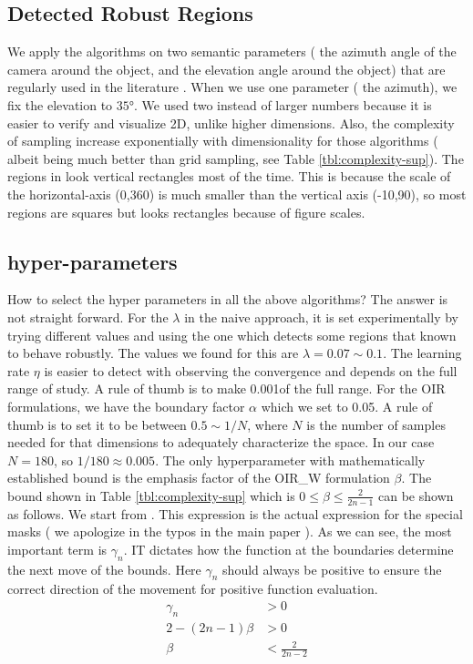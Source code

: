 \subsection{Detected Robust Regions}
We apply the algorithms on two semantic parameters ( the azimuth angle of the camera around the object, and the elevation angle around the object) that are regularly used in the literature \cite{sada,strike}. When we use one parameter ( the azimuth), we fix the elevation to $\ang{35}$. We used two instead of larger numbers because it is easier to verify and visualize 2D, unlike higher dimensions. Also, the complexity of sampling increase exponentially with dimensionality for those algorithms ( albeit being much better than grid sampling, see Table \ref{tbl:complexity-sup}). The regions in \figLabel{\ref{fig:ex1},\ref{fig:ex2}} look vertical rectangles most of the time. This is because the scale of the horizontal-axis (0,360) is much smaller than the vertical axis (-10,90), so most regions are squares but looks rectangles because of figure scales. 

\subsection{hyper-parameters}
How to select the hyper parameters in all the above algorithms? The answer is not straight forward. For the $\lambda$ in the naive approach, it is set experimentally by trying different values and using the one which detects some regions that known to behave robustly. The values we found for this are $\lambda = 0.07\sim0.1$. The learning rate $\eta$ is easier to detect with observing the convergence and depends on the full range of study. A rule of thumb is to make 0.001of the full range. For the OIR formulations, we have the boundary factor $\alpha$ which we set to 0.05. A rule of thumb is to set it to be between  $ 0.5 \sim 1/N$, where $N$ is the number of samples needed for that dimensions to adequately characterize the space. In our case $N=180$, so $1/180 \approx 0.005$. The only hyperparameter with mathematically established bound is the emphasis factor of the OIR\_W formulation $\beta$. The bound shown in Table \ref{tbl:complexity-sup} which is $0 \leq \beta \leq \frac{2}{2n-1}$ can be shown as follows. We start from \eqLabel{\ref{eq:n-mask-grad-sup}}. This expression is the actual expression for the special masks ( we apologize in the typos in the main paper ). As we can see, the most important term is $\gamma_n$. IT dictates how the function at the boundaries determine the next move of the bounds. Here $\gamma_n$ should always be positive to ensure the correct direction of the movement for positive function evaluation.
    \begin{equation}
\begin{aligned} 
 \gamma_n ~~~~~&> 0 \\
 2-(2n-1)\beta  &> 0  \\
 \beta~~~~~~~ &< \frac{2}{2n-2}
\label{eq:gamma}
\end{aligned}
\end{equation}
